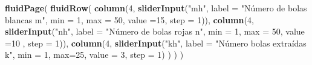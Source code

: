 \documentclass[]{book}
\newenvironment{Shaded}{\begin{snugshade}}{\end{snugshade}}
\newcommand{\DataTypeTok}[1]{\textcolor[rgb]{0.13,0.29,0.53}{#1}}
\newcommand{\DecValTok}[1]{\textcolor[rgb]{0.00,0.00,0.81}{#1}}
\newcommand{\KeywordTok}[1]{\textcolor[rgb]{0.13,0.29,0.53}{\textbf{#1}}}
\newcommand{\NormalTok}[1]{#1}
\newcommand{\StringTok}[1]{\textcolor[rgb]{0.31,0.60,0.02}{#1}}
\begin{document}
\begin{Shaded}
\begin{Highlighting}[]
\KeywordTok{fluidPage}\NormalTok{(}
\KeywordTok{fluidRow}\NormalTok{(}
  \KeywordTok{column}\NormalTok{(}\DecValTok{4}\NormalTok{,}
         \KeywordTok{sliderInput}\NormalTok{(}\StringTok{"mh"}\NormalTok{, }\DataTypeTok{label =} \StringTok{"Número de bolas blancas m"}\NormalTok{,}
              \DataTypeTok{min =} \DecValTok{1}\NormalTok{, }\DataTypeTok{max =} \DecValTok{50}\NormalTok{, }\DataTypeTok{value =}\DecValTok{15}\NormalTok{, }\DataTypeTok{step =} \DecValTok{1}\NormalTok{)),}
  \KeywordTok{column}\NormalTok{(}\DecValTok{4}\NormalTok{,}
         \KeywordTok{sliderInput}\NormalTok{(}\StringTok{"nh"}\NormalTok{, }\DataTypeTok{label =} \StringTok{"Número de bolas rojas n"}\NormalTok{,}
              \DataTypeTok{min =} \DecValTok{1}\NormalTok{, }\DataTypeTok{max =} \DecValTok{50}\NormalTok{, }\DataTypeTok{value =}\DecValTok{10}\NormalTok{ , }\DataTypeTok{step =} \DecValTok{1}\NormalTok{)),}
  \KeywordTok{column}\NormalTok{(}\DecValTok{4}\NormalTok{,}
          \KeywordTok{sliderInput}\NormalTok{(}\StringTok{"kh"}\NormalTok{, }\DataTypeTok{label =} \StringTok{"Número bolas extraídas k"}\NormalTok{,}
                     \DataTypeTok{min =} \DecValTok{1}\NormalTok{, }\DataTypeTok{max=}\DecValTok{25}\NormalTok{, }\DataTypeTok{value =} \DecValTok{3}\NormalTok{, }\DataTypeTok{step =} \DecValTok{1}\NormalTok{)}
\NormalTok{         )}
\NormalTok{  )}
\NormalTok{)}


\end{Highlighting}
\end{Shaded}
\end{document}
